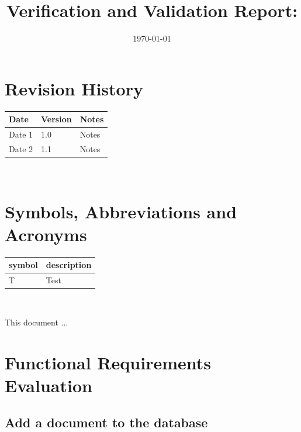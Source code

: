 \documentclass[12pt, titlepage]{article}
\begin{document}
\title{Verification and Validation Report: \progname} 
\author{\authname}
\date{\today}
	
\maketitle


\section{Revision History}

\begin{tabularx}{\textwidth}{p{3cm}p{2cm}X}
\toprule {\bf Date} & {\bf Version} & {\bf Notes}\\
\midrule
Date 1 & 1.0 & Notes\\
Date 2 & 1.1 & Notes\\
\bottomrule
\end{tabularx}

~\newpage

\section{Symbols, Abbreviations and Acronyms}

\renewcommand{\arraystretch}{1.2}
\begin{tabular}{l l} 
  \toprule		
  \textbf{symbol} & \textbf{description}\\
  \midrule 
  T & Test\\
  \bottomrule
\end{tabular}\\


\newpage

\tableofcontents

\listoftables %

\listoffigures %

\newpage


This document ...

\section{Functional Requirements Evaluation} \label{section:3} 

\subsection{Add a document to the database} \label{section:3.1}
\end{document}

